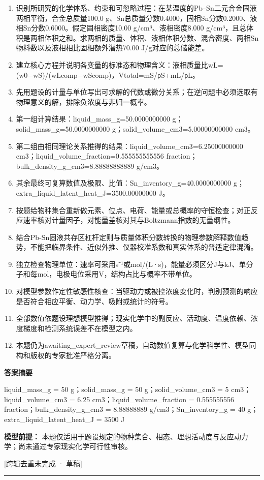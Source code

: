 \documentclass[UTF8,11pt,a4paper]{ctexart}
\begin{document}
\begin{enumerate}
\item 识别所研究的化学体系、约束和可忽略过程：在某温度的Pb–Sn二元合金固液两相平衡，合金总质量100.0 g、Sn总质量分数0.4000，固相Sn分数0.2000、液相Sn分数0.6000。假定固相密度10.00 g/cm³、液相密度8.000 g/cm³，且总体积是两相体积之和。求两相的质量、体积、液相体积分数、混合密度、两相Sn物料数以及液相相比固相额外潜热70.00 J/g对应的总储能差。
\item 建立核心方程并说明各变量的标准态和物理含义：液相质量比wL=(w0−wS)/(wLcomp−wScomp)，Vtotal=mS/ρS+mL/ρL。
\item 先用题设的计量与单位写出可求解的代数或微分关系；在逆问题中必须选取有物理意义的解，排除负浓度与非归一概率。
\item 第一组计算结果：liquid\_mass\_g=50.0000000000 g；solid\_mass\_g=50.0000000000 g；solid\_volume\_cm3=5.00000000000 cm3。
\item 第二组由相同理论关系推得的结果：liquid\_volume\_cm3=6.25000000000 cm3；liquid\_volume\_fraction=0.555555555556 fraction；bulk\_density\_g\_cm3=8.88888888889 g/cm3。
\item 其余最终可复算数值及极限、比值：Sn\_inventory\_g=40.0000000000 g；extra\_liquid\_latent\_heat\_J=3500.00000000 J。
\item 按题给物种集合重新做元素、位点、电荷、能量或总概率的守恒检查；对正反应速率核对计量因子，对能量差核对其与Boltzmann指数的无量纲性。
\item 结合Pb-Sn固液共存区杠杆定则与质量体积分数转换的物理参数解释数值趋势，不能把临界条件、近似外推、仪器校准系数和真实体系的普适定律混淆。
\item 独立检查物理单位：速率可采用s⁻¹或mol/(L·s)，能量必须区分J与kJ、单分子和每mol，电极电位采用V，结构占比与概率不带单位。
\item 对模型参数作定性敏感性核查：当驱动力或被控浓度变化时，判别预测的响应是否符合相应平衡、动力学、吸附或统计的符号。
\item 全部数值依题设理想模型推得；现实化学中的副反应、活动度、温度依赖、浓度梯度和检测系统误差不在模型之内。
\item 本题仍为awaiting\_expert\_review草稿，自动数值复算与化学科学性、模型同构和版权的专家批准严格分离。
\end{enumerate}
\noindent\textbf{答案摘要}\par
liquid\_mass\_g = 50 g；solid\_mass\_g = 50 g；solid\_volume\_cm3 = 5 cm3；liquid\_volume\_cm3 = 6.25 cm3；liquid\_volume\_fraction = 0.555555556 fraction；bulk\_density\_g\_cm3 = 8.88888889 g/cm3；Sn\_inventory\_g = 40 g；extra\_liquid\_latent\_heat\_J = 3500 J\par
\noindent\textbf{模型前提：}
本题仅适用于题设规定的物种集合、相态、理想活动度与反应动力学；尚未通过专家现实化学可行性审核。\par
\noindent\textcolor{red!65!black}{[跨辑去重未完成 · 草稿]} \par
\medskip\hrule\medskip
{}
\end{document}
